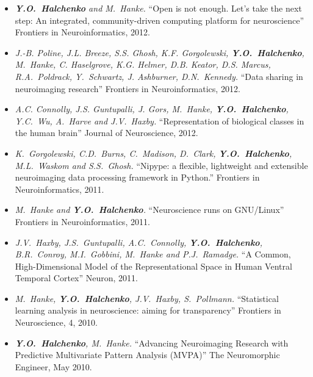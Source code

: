 \documentclass[12pt,overlapped,line]{res}
\newcommand{\mtitle}[1]{``#1''}
\newcommand{\mauthors}[1]{ \textit{#1.}}
\newcommand{\mwhere}[1]{#1.}
\begin{document}
\begin{resume}
 \begin{itemize}

 \item
  \mauthors{\textbf{Y.O.~Halchenko} and M.~Hanke}
  \mtitle{Open is not enough. Let’s take the next step: An integrated,
    community-driven computing platform for neuroscience}
  \mwhere{Frontiers in Neuroinformatics, 2012}

 \item
   \mauthors{J.-B. Poline, J.L. Breeze, S.S. Ghosh, K.F. Gorgolewski,
     \textbf{Y.O.~Halchenko}, M.~Hanke, C. Haselgrove, K.G. Helmer,
     D.B. Keator, D.S. Marcus, R.A.~Poldrack, Y.~Schwartz,
     J. Ashburner,  D.N.~Kennedy}
   \mtitle{Data sharing in neuroimaging research}
   \mwhere{Frontiers in Neuroinformatics, 2012}

 \item
   \mauthors{A.C.  Connolly, J.S.  Guntupalli, J. Gors, M.~Hanke,
     \textbf{Y.O.~Halchenko}, Y.C.~Wu, A.~Harve and J.V.~Haxby}
   \mtitle{Representation of biological classes in the human brain}
   \mwhere{Journal of Neuroscience, 2012}

 \item
   \mauthors{K.~Gorgolewski, C.D.~Burns, C.~Madison, D.~Clark, \textbf{Y.O.~Halchenko},
     M.L.~Waskom and S.S.~Ghosh}
   \mtitle{Nipype: a flexible, lightweight and extensible neuroimaging data processing framework in Python.}
   \mwhere{Frontiers in Neuroinformatics, 2011}


 \item
   \mauthors{M.~Hanke and \textbf{Y.O.~Halchenko}}
   \mtitle{Neuroscience runs on {GNU/Linux}}
   \mwhere{Frontiers in Neuroinformatics, 2011}

 \item
   \mauthors{J.V.~Haxby, J.S.~Guntupalli, A.C.~Connolly,
     \textbf{Y.O.~Halchenko}, B.R.~Conroy, M.I.~Gobbini, M.~Hanke and
     P.J.~Ramadge}
   \mtitle{A Common, High-Dimensional Model of the Representational
     Space in Human Ventral Temporal Cortex}
   \mwhere{Neuron, 2011}

 \item
   \mauthors{M.~Hanke, \textbf{Y.O.~Halchenko}, J.V.~Haxby, S.~Pollmann}
   \mtitle{Statistical learning analysis in neuroscience: aiming for
     transparency}
   \mwhere{Frontiers in Neuroscience, 4, 2010}

 \item
   \mauthors{\textbf{Y.O.~Halchenko}, M.~Hanke}
    \mtitle{Advancing Neuroimaging Research with Predictive Multivariate
      Pattern Analysis (MVPA)}
    \mwhere{The Neuromorphic Engineer, May 2010}


\end{itemize}
\end{resume}
\end{document}
